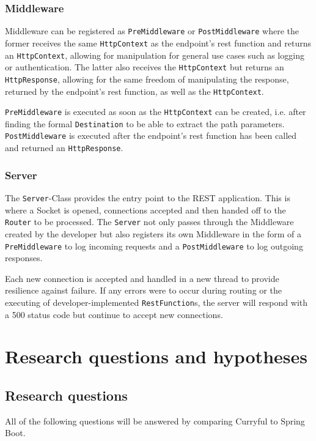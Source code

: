 \documentclass[a4paper,titlepage]{article}
\begin{document}
\subsubsection{Middleware}
Middleware can be registered as \verb|PreMiddleware| or \verb|PostMiddleware|
where the former receives the same \verb|HttpContext| as the endpoint's rest
function and returns an \verb|HttpContext|, allowing for manipulation for
general use cases such as logging or authentication. The latter also receives
the \verb|HttpContext| but returns an \verb|HttpResponse|, allowing for the same
freedom of manipulating the response, returned by the endpoint's rest function,
as well as the \verb|HttpContext|.

\verb|PreMiddleware| is executed as soon as the \verb|HttpContext| can be
created, i.e. after finding the formal \verb|Destination| to be able to extract
the path parameters. \verb|PostMiddleware| is executed after the endpoint's rest
function has been called and returned an \verb|HttpResponse|.

\subsubsection{Server}
The \verb|Server|-Class provides the entry point to the REST application. This
is where a Socket is opened, connections accepted and then handed off to the
\verb|Router| to be processed. The \verb|Server| not only passes through the
Middleware created by the developer but also registers its own Middleware in
the form of a \verb|PreMiddleware| to log incoming requests and a
\verb|PostMiddleware| to log outgoing responses.\newline

\noindent Each new connection is accepted and handled in a new thread to provide
resilience against failure. If any errors were to occur during routing or the
executing of developer-implemented \verb|RestFunction|s, the server will respond
with a 500 status code but continue to accept new connections.

\section{Research questions and hypotheses}
\subsection{Research questions}

All of the following questions will be answered by comparing Curryful to Spring
Boot.
\end{document}

